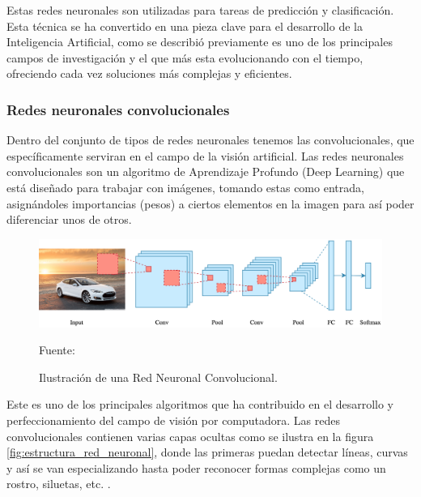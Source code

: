 Estas redes neuronales son utilizadas para tareas de predicción y clasificación. Esta técnica se ha convertido en una pieza clave para el desarrollo de la Inteligencia Artificial, como se describió previamente es uno de los principales campos de investigación y el que más esta evolucionando con el tiempo, ofreciendo cada vez soluciones más complejas y eficientes.

\subsubsection{Redes neuronales convolucionales}
Dentro del conjunto de tipos de redes neuronales tenemos las convolucionales, que específicamente serviran en el campo de la visión artificial. Las redes neuronales convolucionales son un algoritmo de Aprendizaje Profundo (Deep Learning) que está diseñado para trabajar con imágenes, tomando estas como entrada, asignándoles importancias (pesos) a ciertos elementos en la imagen para así poder diferenciar unos de otros.\\

\begin{figure}[H]
    \begin{center}
        \includegraphics[width=15cm]{img/capitulo_2/convolucional.png}
        \caption{Ilustración de una Red Neuronal Convolucional.\\}
        Fuente: \cite{intro_redes_neuronales}
        \label{fig:red_neuronal_convolucional}
    \end{center}
\end{figure}

Este es uno de los principales algoritmos que ha contribuido en el desarrollo y perfeccionamiento del campo de visión por computadora. Las redes convolucionales contienen varias capas ocultas como se ilustra en la figura \ref{fig:estructura_red_neuronal}, donde las primeras puedan detectar líneas, curvas y así se van especializando hasta poder reconocer formas complejas como un rostro, siluetas, etc. \cite{convolutional:ia}. \\

